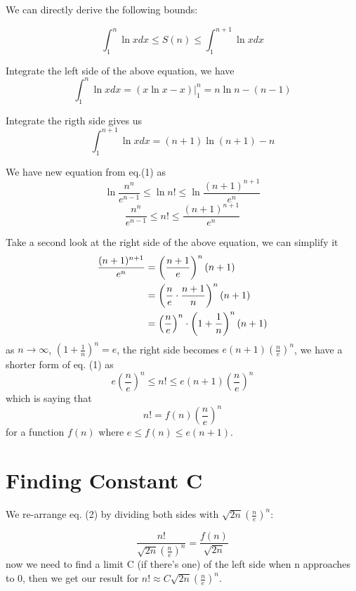 \documentclass[11pt]{article}
\begin{document}
We can directly derive the following bounds:

\begin{equation}
 \int^{n}_{1} \ln x dx \leqslant  S(n) \leqslant \int ^{n+1} _ {1} \ln x dx
\end{equation}


Integrate the left side of the above equation,  we have 
$$ \int ^n _1 \ln x dx = (x \ln x - x) \bigg \rvert ^n _1 = n \ln n - (n - 1) $$

Integrate the rigth side gives us
$$ \int ^{n+1} _ {1} \ln x dx =  (n+1) \ln (n+1) - n $$

We have new equation from eq.(1) as
$$ \ln \frac {n^n}{e^{n-1}} \leqslant \ln n! \leqslant \ln \frac{(n+1)^{n+1}}{e^n} $$ 
$$ \frac {n^n}{e^{n-1}} \leqslant n! \leqslant  \frac{(n+1)^{n+1}}{e^n} $$

Take a second look at the right side of the above equation,  we can simplify it
$$
\begin{aligned}[t]
\frac{(n+1)^{n+1}}{e^n} 
 	&= \left( \frac{n+1}{e} \right) ^n  (n+1) \\
 	&= \left( \frac{n}{e} \cdot \frac{n+1}{n} \right) ^n (n+1) \\
 	&= \left( \frac{n}{e} \right) ^n \cdot \left( 1 + \frac{1}{n} \right) ^n (n+1)
\end{aligned}\\
$$
as $n \to \infty$,  $\displaystyle \left( 1 + \frac{1}{n} \right) ^n = e$,  the right side becomes $ \displaystyle e(n+1) \left( \frac{n}{e} \right) ^n$,  we have a shorter form of eq. (1) as
$$ e \left( \frac{n}{e} \right) ^n \leqslant n! \leqslant e(n+1) \left( \frac{n}{e} \right) ^n $$
which is saying that 
\begin{equation}
n! = f(n) \left( \frac{n}{e} \right) ^n
\end{equation}
for a function $f(n)$ where $ e \leqslant f(n) \leqslant e(n+1) $.


\section {\large Finding Constant C}

We re-arrange eq. (2) by dividing both sides with $ \displaystyle \sqrt{2n} \left( \frac{n}{e} \right) ^n $:

$$ \displaystyle  \frac {n!}  { \sqrt{2n}  \left( \frac{n}{e} \right) ^n } = \frac {f(n)} { \sqrt{2n} } $$
now we need to find a limit C (if there's one) of the left side when n approaches to 0,  then we get our result for                 $\displaystyle n! \approx C  \sqrt{2n}  \left( \frac{n}{e} \right) ^n $.
\end{document}
